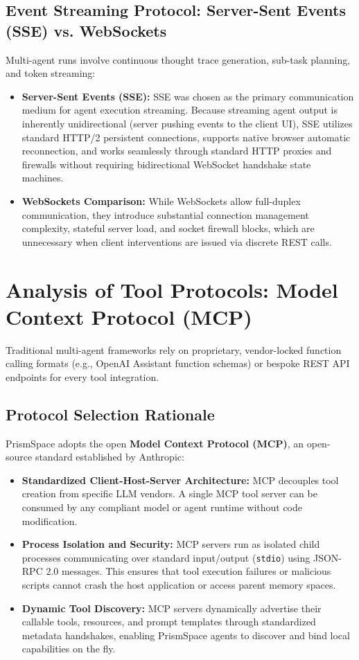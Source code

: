 \documentclass[12pt,a4paper]{report}
\begin{document}
\subsection{Event Streaming Protocol: Server-Sent Events (SSE) vs. WebSockets}
Multi-agent runs involve continuous thought trace generation, sub-task planning, and token streaming:
\begin{itemize}
    \item \textbf{Server-Sent Events (SSE):} SSE was chosen as the primary communication medium for agent execution streaming. Because streaming agent output is inherently unidirectional (server pushing events to the client UI), SSE utilizes standard HTTP/2 persistent connections, supports native browser automatic reconnection, and works seamlessly through standard HTTP proxies and firewalls without requiring bidirectional WebSocket handshake state machines.
    \item \textbf{WebSockets Comparison:} While WebSockets allow full-duplex communication, they introduce substantial connection management complexity, stateful server load, and socket firewall blocks, which are unnecessary when client interventions are issued via discrete REST calls.
\end{itemize}

\section{Analysis of Tool Protocols: Model Context Protocol (MCP)}
Traditional multi-agent frameworks rely on proprietary, vendor-locked function calling formats (e.g., OpenAI Assistant function schemas) or bespoke REST API endpoints for every tool integration.

\subsection{Protocol Selection Rationale}
PrismSpace adopts the open \textbf{Model Context Protocol (MCP)}, an open-source standard established by Anthropic:
\begin{itemize}
    \item \textbf{Standardized Client-Host-Server Architecture:} MCP decouples tool creation from specific LLM vendors. A single MCP tool server can be consumed by any compliant model or agent runtime without code modification.
    \item \textbf{Process Isolation and Security:} MCP servers run as isolated child processes communicating over standard input/output (\texttt{stdio}) using JSON-RPC 2.0 messages. This ensures that tool execution failures or malicious scripts cannot crash the host application or access parent memory spaces.
    \item \textbf{Dynamic Tool Discovery:} MCP servers dynamically advertise their callable tools, resources, and prompt templates through standardized metadata handshakes, enabling PrismSpace agents to discover and bind local capabilities on the fly.
\end{itemize}
\end{document}
